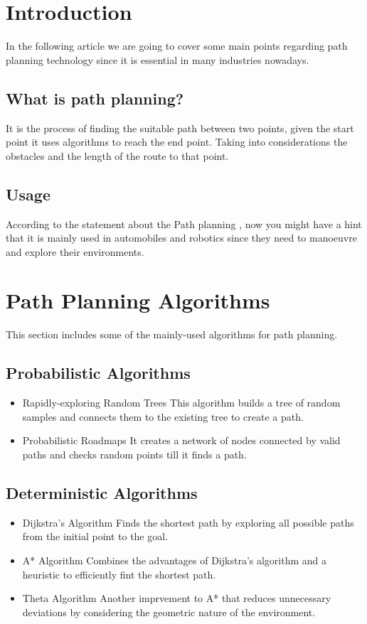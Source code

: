 \documentclass{article}
\begin{document}
\section{Introduction}
In the following article we are going to cover some main points regarding path planning technology since it is essential in many industries nowadays.

\subsection{What is path planning?}

It is the process of finding the suitable path between two points, given the start point it uses algorithms to reach the end point. Taking into considerations the obstacles and the length of the route to that point.

\subsection{Usage}
According to the statement about the Path planning , now you might have a hint that it is mainly used in automobiles and robotics since they need to manoeuvre and explore their environments.

\section{Path Planning Algorithms}
This section includes some of the mainly-used algorithms for path planning.
\subsection{Probabilistic Algorithms}
\begin{itemize}
	\item Rapidly-exploring Random Trees
This algorithm builds a tree of random samples and connects them to the existing tree to create a path.
	\item Probabilistic Roadmaps
It creates a network of nodes connected by valid paths and checks random points till it finds a path.
\end{itemize}

\subsection{Deterministic Algorithms}
\begin{itemize}
	\item Dijkstra's Algorithm
Finds the shortest path by exploring all possible paths from the initial point to the goal.
	\item A* Algorithm
Combines the advantages of Dijkstra's algorithm and a heuristic to efficiently fint the shortest path.
	\item Theta Algorithm
Another imprvement to A* that reduces unnecessary deviations by considering the geometric nature of the environment.
\end{itemize}
\end{document}

